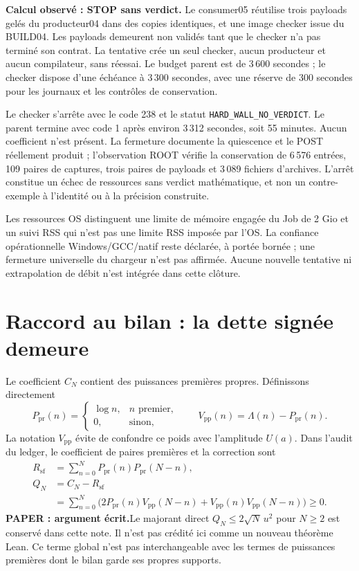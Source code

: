 \documentclass[11pt,a4paper]{article}
\theoremstyle{remark}
\newcommand{\Lam}{\Lambda}
\newcommand{\paper}{\textbf{PAPER : argument écrit.}\space}
\begin{document}
\textbf{Calcul observé : STOP sans verdict.} Le consumer05 réutilise
trois payloads gelés du producteur04 dans des copies identiques, et une
image checker issue du BUILD04. Les payloads demeurent non validés tant
que le checker n'a pas terminé son contrat. La tentative crée un seul
checker, aucun producteur et aucun compilateur, sans réessai.
Le budget parent est de 3\,600 secondes ; le checker dispose d'une
échéance à 3\,300 secondes, avec une réserve de 300 secondes pour les
journaux et les contrôles de conservation.

Le checker s'arrête avec le code 238 et le statut
\texttt{HARD\_WALL\_NO\_VERDICT}. Le parent termine avec code 1 après
environ 3\,312 secondes, soit 55 minutes. Aucun coefficient n'est présent.
La fermeture documente la quiescence et le POST réellement produit ;
l'observation ROOT vérifie la conservation de 6\,576 entrées, 109 paires
de captures, trois paires de payloads et 3\,089 fichiers d'archives.
L'arrêt constitue un échec de ressources sans verdict mathématique,
et non un contre-exemple à l'identité ou à la précision construite.

Les ressources OS distinguent une limite de mémoire engagée du Job de
2 Gio et un suivi RSS qui n'est pas une limite RSS imposée par l'OS.
La confiance opérationnelle Windows/GCC/natif reste déclarée, à portée
bornée ; une fermeture universelle du chargeur n'est pas affirmée.
Aucune nouvelle tentative ni extrapolation de débit n'est intégrée
dans cette clôture.

\clearpage
\section{Raccord au bilan : la dette signée demeure}\label{sec:dn}
Le coefficient $C_N$ contient des puissances premières propres.
Définissons directement
\[
P_{\mathrm{pr}}(n)=\begin{cases}\log n,&n\text{ premier},\\0,&\text{sinon},\end{cases}
\qquad V_{\mathrm{pp}}(n)=\Lam(n)-P_{\mathrm{pr}}(n).
\]
La notation $V_{\mathrm{pp}}$ évite de confondre ce poids avec l'amplitude
$U(a)$. Dans l'audit du ledger, le coefficient de paires premières et la
correction sont
\begin{align}
R_{\mathrm{sf}}&=\sum_{n=0}^N P_{\mathrm{pr}}(n)P_{\mathrm{pr}}(N-n),\\
Q_N&=C_N-R_{\mathrm{sf}}\nonumber\\
&=\sum_{n=0}^N\bigl(2P_{\mathrm{pr}}(n)V_{\mathrm{pp}}(N-n)
+V_{\mathrm{pp}}(n)V_{\mathrm{pp}}(N-n)\bigr)\ge0.
\label{eq:PP}
\end{align}
\paper Le majorant direct $Q_N\le2\sqrt N\,u^2$ pour $N\ge2$
est conservé dans cette note. Il n'est pas crédité ici comme un nouveau
théorème Lean. Ce terme global n'est pas interchangeable avec les termes
de puissances premières dont le bilan garde ses propres supports.
\end{document}
